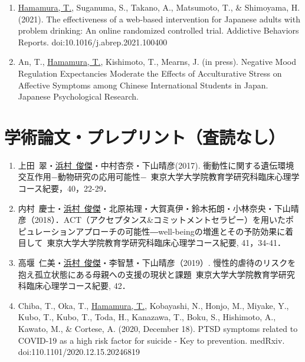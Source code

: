\documentclass{article}
\begin{document}
\begin{enumerate}
	\item \underline{Hamamura, T.}, Suganuma, S., Takano, A., Matsumoto, T., \& Shimoyama, H. (2021). The effectiveness of a web-based intervention for Japanese adults with problem drinking: An online randomized controlled trial. Addictive Behaviors Reports. doi:10.1016/j.abrep.2021.100400
	\item An, T., \underline{Hamamura, T.}, Kishimoto, T., Mearns, J. (in press). Negative Mood Regulation Expectancies Moderate the Effects of Acculturative Stress on Affective Symptoms among Chinese International Students in Japan. Japanese Psychological Research.
\end{enumerate}

\section{学術論文・プレプリント（査読なし）}
\begin{enumerate}
	\item 上田\ 翠・\underline{浜村\ 俊傑}・中村杏奈・下山晴彦(2017). 衝動性に関する遺伝環境交互作用−動物研究の応用可能性−\ 東京大学大学院教育学研究科臨床心理学コース紀要，40，22-29．
	\item 内村\ 慶士・\underline{浜村\ 俊傑}・北原祐理・大賀真伊・鈴木拓朗・小林奈央・下山晴彦（2018）．ACT（アクセプタンス\&コミットメントセラピー）を用いたポピュレーションアプローチの可能性―well-beingの増進とその予防効果に着目して\ 東京大学大学院教育学研究科臨床心理学コース紀要, 41，34-41．
	\item 高堰\ 仁美・\underline{浜村\ 俊傑}・李智慧・下山晴彦（2019）. 慢性的虐待のリスクを抱え孤立状態にある母親への支援の現状と課題\ 東京大学大学院教育学研究科臨床心理学コース紀要, 42．
	\item Chiba, T., Oka, T., \underline{Hamamura, T.}, Kobayashi, N., Honjo, M., Miyake, Y., Kubo, T., Kubo, T., Toda, H., Kanazawa, T., Boku, S., Hishimoto, A., Kawato, M., \& Cortese, A. (2020, December 18). PTSD symptoms related to COVID-19 as a high risk factor for suicide - Key to prevention. medRxiv. doi:110.1101/2020.12.15.20246819
\end{enumerate}
\end{document}
